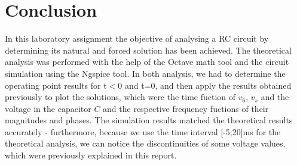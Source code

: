 \section{Conclusion}
\label{sec:conclusion}

In this laboratory assignment the objective of analysing a RC circuit by determining its natural and forced solution has been achieved. The theoretical analysis was performed with the help of the Octave math tool and the circuit simulation using the Ngspice tool. In both analysis, we had to determine the operating point results for t$<$0 and t=0, and then apply the results obtained previously to plot the solutions, which were the time fuction of $v_6$, $v_s$ and the voltage in the capacitor $C$ and the respective frequency fuctions of their magnitudes and phases. The simulation results matched the theoretical results accurately - furthermore, because we use the time interval [-5;20]ms for the theoretical analysis, we can notice the discontinuities of some voltage values, which were previously explained in this report.
